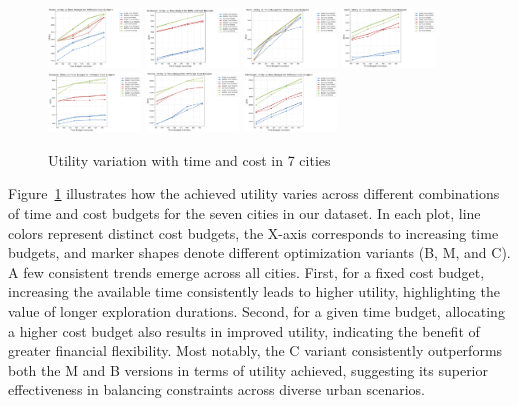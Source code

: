 \begin{figure}[H]
\includegraphics[width=0.22\textwidth]{plots/exp1-osaka.png}
\includegraphics[width=0.22\textwidth]{plots/exp1-budapest.png}
\includegraphics[width=0.22\textwidth]{plots/exp1-perth.png}
\includegraphics[width=0.22\textwidth]{plots/exp1-delhi.png}
\includegraphics[width=0.22\textwidth]{plots/exp1-glasgow.png}
\includegraphics[width=0.22\textwidth]{plots/exp-1 vienna.png}
\centering
\includegraphics[width=0.22\textwidth]{plots/exp1-edinburgh.png}
\caption{Utility variation with time and cost in 7 cities}
\label{fig:cities}
\end{figure}

Figure~\ref{fig:cities} illustrates how the achieved utility varies across different combinations of time and cost budgets for the seven cities in our dataset. In each plot, line colors represent distinct cost budgets, the X-axis corresponds to increasing time budgets, and marker shapes denote different optimization variants (B, M, and C). A few consistent trends emerge across all cities. First, for a fixed cost budget, increasing the available time consistently leads to higher utility, highlighting the value of longer exploration durations. Second, for a given time budget, allocating a higher cost budget also results in improved utility, indicating the benefit of greater financial flexibility. Most notably, the C variant consistently outperforms both the M and B versions in terms of utility achieved, suggesting its superior effectiveness in balancing constraints across diverse urban scenarios.\\

